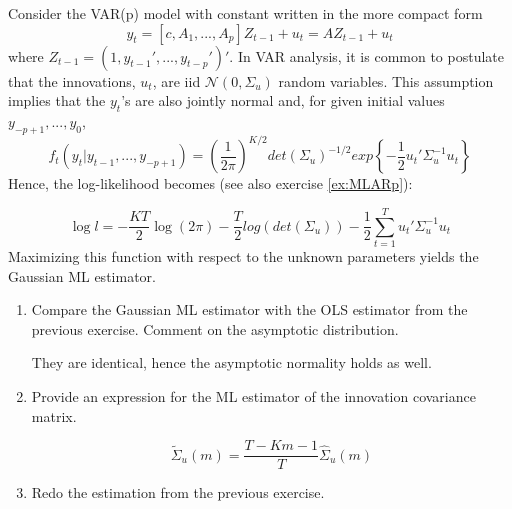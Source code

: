Consider the VAR(p) model with constant written in the more compact form
$$ y_t = [c, A_1, ..., A_p] Z_{t-1} + u_t = A Z_{t-1}+ u_t$$
where $Z_{t-1}=(1,y_{t-1}',...,y_{t-p}')'$. In VAR analysis, it is common to postulate that the innovations, $u_t$, are iid $\mathcal{N}(0,\Sigma_u)$ random variables. This assumption implies that the $y_t$'s are also jointly normal and, for given initial values $y_{-p+1},...,y_{0}$,
$$f_t(y_t|y_{t-1},...,y_{-p+1})=\left(\frac{1}{2\pi}\right)^{K/2} det(\Sigma_u)^{-1/2}exp\left\{-\frac{1}{2}u_t'\Sigma_u^{-1}u_t\right\}$$
Hence, the log-likelihood becomes (see also exercise \ref{ex:MLARp}):

$$\log l = -\frac{KT}{2}\log(2\pi) - \frac{T}{2}log(det(\Sigma_u))- \frac{1}{2}\sum_{t=1}^Tu_t'\Sigma_u^{-1}u_t$$
Maximizing this function with respect to the unknown parameters yields the Gaussian ML estimator.
\begin{enumerate}
    \item Compare the Gaussian ML estimator with the OLS estimator from the previous exercise. Comment on the asymptotic distribution.
          \begin{solution}
              They are identical, hence the asymptotic normality holds as well.
          \end{solution}
    \item Provide an expression for the ML estimator of the innovation covariance matrix.
          \begin{solution}
              $$\tilde{\Sigma}_u(m) = \frac{T-Km-1}{T}\hat{\Sigma}_u(m)$$
          \end{solution}
    \item Redo the estimation from the previous exercise.
          \begin{solution}
              
          \end{solution}
\end{enumerate}

\newpage
